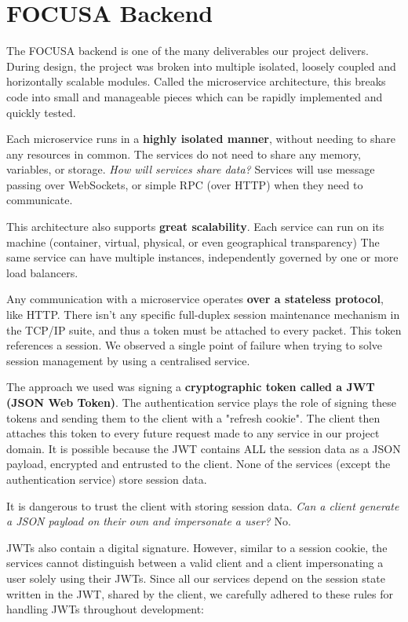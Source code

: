 \section{FOCUSA Backend}

The FOCUSA backend is one of the many deliverables our project delivers.
During design, the project was broken into multiple isolated, loosely coupled and horizontally scalable modules. 
Called the microservice architecture, this breaks code into small and manageable pieces which can be rapidly implemented and quickly tested.

Each microservice runs in a \textbf{highly isolated manner}, without needing to share any resources in common. The services do not need to share any memory, variables, or storage. 
\emph{How will services share data?} 
Services will use message passing over WebSockets, or simple RPC (over HTTP) when they need to communicate.

This architecture also supports \textbf{great scalability}. Each service can run on its machine (container, virtual, physical, or 
even geographical transparency) 
The same service can have multiple instances, independently governed by one or more load balancers.

Any communication with a microservice operates \textbf{over a stateless protocol}, like HTTP.
There isn't any specific full-duplex session maintenance mechanism in the TCP/IP suite, and thus a token must be attached to every packet. This token references a session. We observed a single point of failure when trying to solve session management by using a centralised service.

The approach we used was signing a \textbf{cryptographic token called a JWT (JSON Web Token)}. 
The authentication service plays the role of signing these tokens and sending them to the client with a "refresh cookie". The client then attaches this token to every future request made to any service in our project domain. It is possible because the JWT contains 
ALL the session data as a JSON payload, encrypted and entrusted to the client. None of the services (except the authentication service) store session data.

It is dangerous to trust the client with storing session data. \emph{Can a client generate a JSON payload on their own and impersonate a user?} No.~\cite{JWTBestPractices}

JWTs also contain a digital signature. However, similar to a session cookie, the services cannot distinguish between a valid client and a client impersonating a user solely using their JWTs. Since all our services depend on the session state written in the JWT, shared by the client, we carefully adhered to these rules for handling JWTs throughout development:

